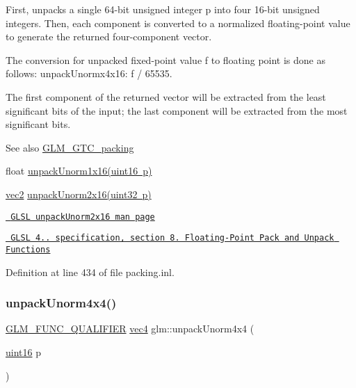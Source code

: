 First, unpacks a single 64-\/bit unsigned integer p into four 16-\/bit unsigned integers. Then, each component is converted to a normalized floating-\/point value to generate the returned four-\/component vector.

The conversion for unpacked fixed-\/point value f to floating point is done as follows\+: unpack\+Unormx4x16\+: f / 65535.

The first component of the returned vector will be extracted from the least significant bits of the input; the last component will be extracted from the most significant bits.

\begin{DoxySeeAlso}{See also}
\mbox{\hyperlink{group__gtc__packing}{G\+L\+M\+\_\+\+G\+T\+C\+\_\+packing}} 

float \mbox{\hyperlink{group__gtc__packing_ga7770e3ade4f4764cc1b2eb42ac4ec188}{unpack\+Unorm1x16(uint16 p)}} 

\mbox{\hyperlink{group__core__types_gaa1618f51db67eaa145db101d8c8431d8}{vec2}} \mbox{\hyperlink{group__core__func__packing_ga11776a74e1885a14e1295d6e917a9ae2}{unpack\+Unorm2x16(uint32 p)}} 

\href{http://www.opengl.org/sdk/docs/manglsl/xhtml/unpackUnorm2x16.xml}{\texttt{ G\+L\+SL unpack\+Unorm2x16 man page}} 

\href{http://www.opengl.org/registry/doc/GLSLangSpec.4.20.8.pdf}{\texttt{ G\+L\+SL 4.. specification, section 8. Floating-\/\+Point Pack and Unpack Functions}} 
\end{DoxySeeAlso}


Definition at line 434 of file packing.\+inl.

\mbox{\label{group__gtc__packing_ga38a0a518d53e15a9481c31dc1e574a40}} 
\subsubsection{\texorpdfstring{unpackUnorm4x4()}{unpackUnorm4x4()}}
{\footnotesize\ttfamily \mbox{\hyperlink{setup_8hpp_a33fdea6f91c5f834105f7415e2a64407}{G\+L\+M\+\_\+\+F\+U\+N\+C\+\_\+\+Q\+U\+A\+L\+I\+F\+I\+ER}} \mbox{\hyperlink{group__core__types_ga5881b1b022d7fd1b7218f5916532dd02}{vec4}} glm\+::unpack\+Unorm4x4 (\begin{DoxyParamCaption}\item[{\mbox{\hyperlink{group__gtc__type__precision_gad8c2939e1fdd8e5828b31d95c52255d5}{uint16}}}]{p }\end{DoxyParamCaption})}

